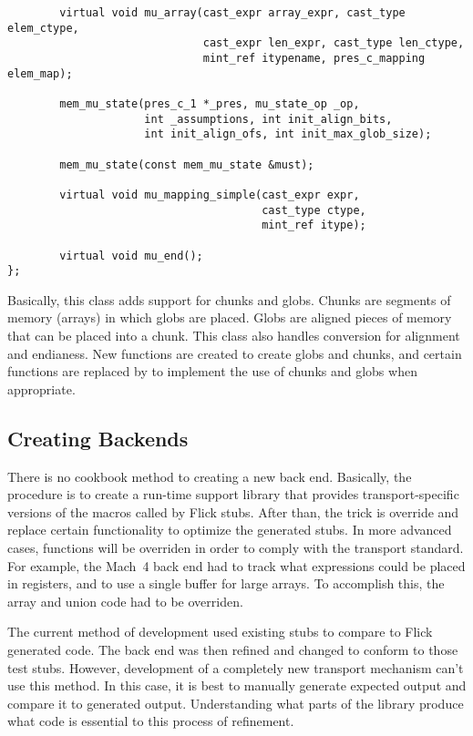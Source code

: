 \begin{verbatim}
        virtual void mu_array(cast_expr array_expr, cast_type elem_ctype,
                              cast_expr len_expr, cast_type len_ctype,
                              mint_ref itypename, pres_c_mapping elem_map);

        mem_mu_state(pres_c_1 *_pres, mu_state_op _op,
                     int _assumptions, int init_align_bits,
                     int init_align_ofs, int init_max_glob_size);

        mem_mu_state(const mem_mu_state &must);

        virtual void mu_mapping_simple(cast_expr expr,
                                       cast_type ctype,
                                       mint_ref itype);

        virtual void mu_end();
};
\end{verbatim}

Basically, this class adds support for chunks and globs.  Chunks are segments
of memory (arrays) in which globs are placed.  Globs are aligned pieces of
memory that can be placed into a chunk.  This class also handles conversion for
alignment and endianess.  New functions are created to create globs and chunks,
and certain functions are replaced by \mmus{} to implement the use of chunks
and globs when appropriate.


\subsection{Creating Backends}

There is no cookbook method to creating a new back end.  Basically, the
procedure is to create a run-time support library that provides
transport-specific versions of the macros called by Flick stubs.  After than,
the trick is override and replace certain functionality to optimize the
generated stubs.  In more advanced cases, functions will be overriden in order
to comply with the transport standard.  For example, the Mach~4 back end had to
track what expressions could be placed in registers, and to use a single buffer
for large arrays.  To accomplish this, the array and union code had to be
overriden.

The current method of development used existing stubs to compare to Flick
generated code.  The back end was then refined and changed to conform to those
test stubs.  However, development of a completely new transport mechanism can't
use this method.  In this case, it is best to manually generate expected output
and compare it to generated output.  Understanding what parts of the library
produce what code is essential to this process of refinement.

